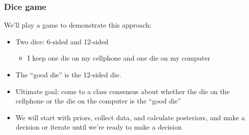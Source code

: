 \documentclass[slidestop,compress,mathserif,11pt,t,professionalfonts,xcolor=table]{beamer}
\begin{document}

\begin{frame}
\frametitle{Dice game}

We'll play a game to demonstrate this approach:

\begin{itemize}

\item Two dice: 6-sided and 12-sided
\begin{itemize}
\item I keep one die on my cellphone and one die on my computer
\end{itemize}

\pause

\item The ``good die'' is the 12-sided die.

\pause

\item Ultimate goal: come to a class consensus about whether the die on the cellphone or the die on the computer is the ``good die''

\pause

\item We will start with priors, collect data, and calculate posteriors, and make a decision or iterate until we're ready to make a decision

\end{itemize}

\end{frame}

\end{document}
